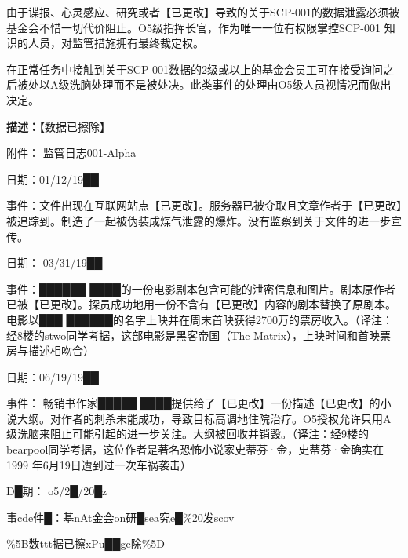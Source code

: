 \documentclass[openany,a4paper]{book} %
\begin{document}
由于谍报、心灵感应、研究或者【已更改】导致的关于SCP-001的数据泄露必须被基金会不惜一切代价阻止。O5级指挥长官，作为唯一一位有权限掌控SCP-001 知识的人员，对监管措施拥有最终裁定权。\vspace{12pt}

在正常任务中接触到关于SCP-001数据的2级或以上的基金会员工可在接受询问之后被处以A级洗脑处理而不是被处决。此类事件的处理由O5级人员视情况而做出决定。\vspace{12pt}

\textbf{描述：}【数据已擦除】\vspace{20pt}

附件： 监管日志001-Alpha

日期：01/12/19██

事件：文件出现在互联网站点【已更改】。服务器已被夺取且文章作者于【已更改】被追踪到。制造了一起被伪装成煤气泄露的爆炸。没有监察到关于文件的进一步宣传。\vspace{12pt}

日期： 03/31/19██

事件：██████ ████的一份电影剧本包含可能的泄密信息和图片。剧本原作者已被【已更改】。探员成功地用一份不含有【已更改】内容的剧本替换了原剧本。电影以███ ██████的名字上映并在周末首映获得2700万的票房收入。（译注：经8楼的stwo同学考据，这部电影是黑客帝国（The Matrix），上映时间和首映票房与描述相吻合）\vspace{12pt}

日期：06/19/19██

事件： 畅销书作家█████ ████提供给了【已更改】一份描述【已更改】的小说大纲。对作者的刺杀未能成功，导致目标高调地住院治疗。O5授权允许只用A 级洗脑来阻止可能引起的进一步关注。大纲被回收并销毁。（译注：经9楼的bearpool同学考据，这位作者是著名恐怖小说家史蒂芬·金，史蒂芬·金确实在1999 年6月19日遭到过一次车祸袭击）\vspace{12pt}

D█期： o5/2█/20█z

事cde件█：基nAt金会on研█sea究e█\%20发scov

\%5B数ttt据已擦xPu██ge除\%5D\vspace{12pt}
\end{document}
